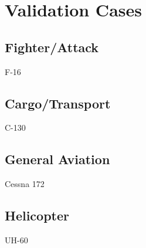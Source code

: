 \chapter{Validation Cases}

\section{Fighter/Attack}

\par F-16

\section {Cargo/Transport}

\par C-130

\section {General Aviation}

\par Cessna 172

\section {Helicopter}

\par UH-60